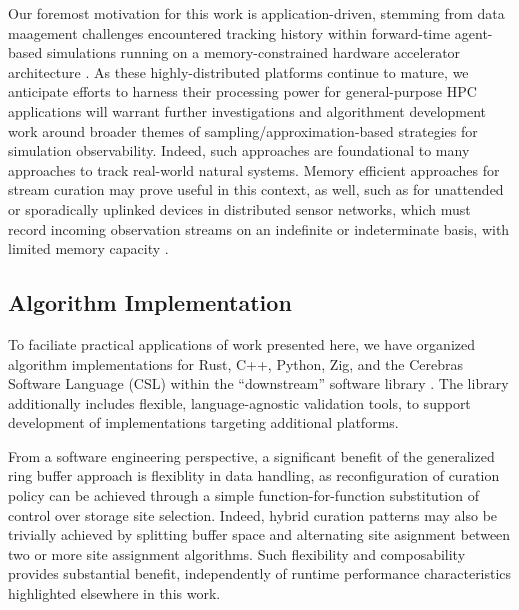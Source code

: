 Our foremost motivation for this work is application-driven, stemming from data maagement challenges encountered tracking history within forward-time agent-based simulations running on a memory-constrained hardware accelerator architecture \citep{moreno2024trackable}.
As these highly-distributed platforms continue to mature, we anticipate efforts to harness their processing power for general-purpose HPC applications will warrant further investigations and algorithment development work around broader themes of sampling/approximation-based strategies for simulation observability.
Indeed, such approaches are foundational to many approaches to track real-world natural systems.
Memory efficient approaches for stream curation may prove useful in this context, as well, such as for unattended or sporadically uplinked devices in distributed sensor networks, which must record incoming observation streams on an indefinite or indeterminate basis, with limited memory capacity \citep{elnahrawy2003research,jain2022survey,hadiatna2016design}.

\subsection{Algorithm Implementation}

To faciliate practical applications of work presented here, we have organized algorithm implementations for Rust, C++, Python, Zig, and the Cerebras Software Language (CSL) within the ``downstream'' software library \citep{moreno2024downstream}.
The library additionally includes flexible, language-agnostic validation tools, to support development of implementations targeting additional platforms.

From a software engineering perspective, a significant benefit of the generalized ring buffer approach is flexiblity in data handling, as reconfiguration of curation policy can be achieved through a simple function-for-function substitution of control over storage site selection.
Indeed, hybrid curation patterns may also be trivially achieved by splitting buffer space and alternating site asignment between two or more site assignment algorithms.
Such flexibility and composability provides substantial benefit, independently of runtime performance characteristics highlighted elsewhere in this work.
